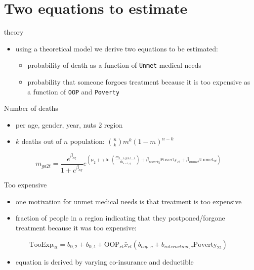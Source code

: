 \documentclass[presentation]{beamer}
\begin{document}
\section*{Two equations to estimate}
\label{sec:orgfaa2c2e}

\begin{frame}[label={sec:org34bca97},fragile]{theory}
 \begin{itemize}
\item using a theoretical model we derive two equations to be estimated:
\begin{itemize}
\item probability of death as a function of \texttt{Unmet} medical needs
\item probability that someone forgoes treatment because it is too expensive as a function of \texttt{OOP} and \texttt{Poverty}
\end{itemize}
\end{itemize}
\end{frame}

\begin{frame}[label={sec:orgc667dc0}]{Number of deaths}
\begin{itemize}
\item per age, gender, year, nuts 2 region
\item \(k\) deaths out of \(n\) population: \(\binom{n}{k} m^{k}(1-m)^{n-k}\)
\end{itemize}
$$
m_{ga2t} = \frac{e^{\beta_{ag}}}{1+e^{\beta_{ag}}} e^{\left( \mu_2 + \gamma \ln \left(\frac{m_{a-1,g,2,t-1}}{\bar{m}_{a-1,g}}\right)+ \beta_{poverty}\text{Poverty}_{2t} + \beta_{unmet}\text{Unmet}_{2t}\right)}
$$
\end{frame}

\begin{frame}[label={sec:org7d44d9e}]{Too expensive}
\begin{itemize}
\item one motivation for unmet medical needs is that treatment is too expensive
\item fraction of people in a region indicating that they postponed/forgone treatment because it was too expensive:
\end{itemize}
$$
\text{TooExp}_{2t} = b_{0,2} + b_{0,t} + \text{OOP}_{ct} \bar{x}_{ct} \left(  b_{oop,c} + b_{interaction,c} \text{Poverty}_{2t} \right)
$$
\begin{itemize}
\item equation is derived by varying co-insurance and deductible
\end{itemize}
\end{frame}
\end{document}
